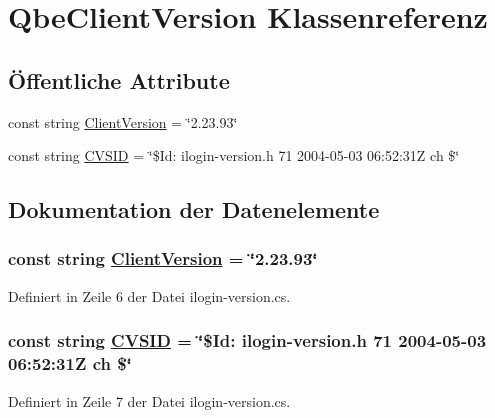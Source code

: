 \hypertarget{classQbe_1_1QbeClientVersion}{
\section{Qbe\-Client\-Version Klassenreferenz}
\label{classQbe_1_1QbeClientVersion}
}
\subsection*{\"{O}ffentliche Attribute}
\begin{CompactItemize}
\item 
const string \hyperlink{classQbe_1_1QbeClientVersion_Qbe_1_1QbeClientVersiono0}{Client\-Version} = \char`\"{}2.23.93\char`\"{}
\item 
const string \hyperlink{classQbe_1_1QbeClientVersion_Qbe_1_1QbeClientVersiono1}{CVSID} = \char`\"{}\$Id: ilogin-version.h 71 2004-05-03 06:52:31Z ch \$\char`\"{}
\end{CompactItemize}


\subsection{Dokumentation der Datenelemente}
\hypertarget{classQbe_1_1QbeClientVersion_Qbe_1_1QbeClientVersiono0}{
\subsubsection[ClientVersion]{\setlength{\rightskip}{0pt plus 5cm}const string \hyperlink{classQbe_1_1QbeClientVersion_Qbe_1_1QbeClientVersiono0}{Client\-Version} = \char`\"{}2.23.93\char`\"{}}}
\label{classQbe_1_1QbeClientVersion_Qbe_1_1QbeClientVersiono0}




Definiert in Zeile 6 der Datei ilogin-version.cs.\hypertarget{classQbe_1_1QbeClientVersion_Qbe_1_1QbeClientVersiono1}{
\subsubsection[CVSID]{\setlength{\rightskip}{0pt plus 5cm}const string \hyperlink{classQbe_1_1QbeClientVersion_Qbe_1_1QbeClientVersiono1}{CVSID} = \char`\"{}\$Id: ilogin-version.h 71 2004-05-03 06:52:31Z ch \$\char`\"{}}}
\label{classQbe_1_1QbeClientVersion_Qbe_1_1QbeClientVersiono1}




Definiert in Zeile 7 der Datei ilogin-version.cs.